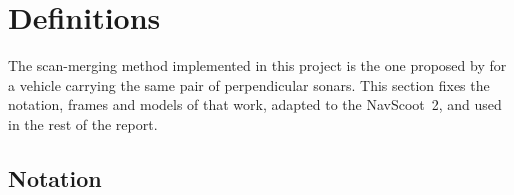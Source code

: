 \section{Definitions}                    %
\label{sec:definitions}                  %

The scan-merging method implemented in this project is the one proposed by
\citet{breux2020elevation} for a vehicle carrying the same pair of perpendicular sonars. This
section fixes the notation, frames and models of that work, adapted to the NavScoot~2, and
used in the rest of the report.

\subsection{Notation}                    %
\label{sec:def_notation}                 %

